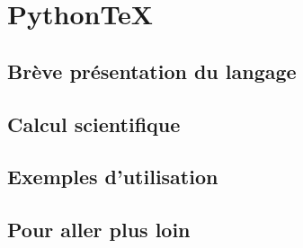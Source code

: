 
\chapter{Python\TeX}

\section{Brève présentation du langage}



\section{Calcul scientifique}



\section{Exemples d'utilisation}



\section{Pour aller plus loin}

